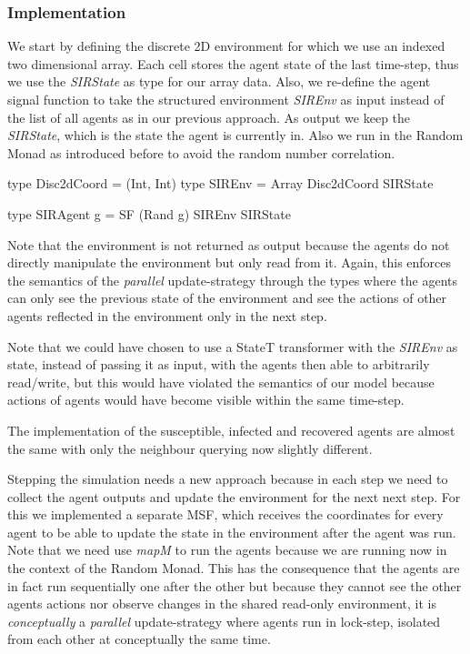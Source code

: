 \subsubsection{Implementation}
We start by defining the discrete 2D environment for which we use an indexed two dimensional array. Each cell stores the agent state of the last time-step, thus we use the \textit{SIRState} as type for our array data. Also, we re-define the agent signal function to take the structured environment \textit{SIREnv} as input instead of the list of all agents as in our previous approach. As output we keep the \textit{SIRState}, which is the state the agent is currently in. Also we run in the Random Monad as introduced before to avoid the random number correlation. 

\begin{HaskellCode}
type Disc2dCoord = (Int, Int)
type SIREnv      = Array Disc2dCoord SIRState

type SIRAgent g  = SF (Rand g) SIREnv SIRState
\end{HaskellCode}

Note that the environment is not returned as output because the agents do not directly manipulate the environment but only read from it. Again, this enforces the semantics of the \textit{parallel} update-strategy through the types where the agents can only see the previous state of the environment and see the actions of other agents reflected in the environment only in the next step.

Note that we could have chosen to use a StateT transformer with the \textit{SIREnv} as state, instead of passing it as input, with the agents then able to arbitrarily read/write, but this would have violated the semantics of our model because actions of agents would have become visible within the same time-step.

The implementation of the susceptible, infected and recovered agents are almost the same with only the neighbour querying now slightly different. 

Stepping the simulation needs a new approach because in each step we need to collect the agent outputs and update the environment for the next next step. For this we implemented a separate MSF, which receives the coordinates for every agent to be able to update the state in the environment after the agent was run. Note that we need use \textit{mapM} to run the agents because we are running now in the context of the Random Monad. This has the consequence that the agents are in fact run sequentially one after the other but because they cannot see the other agents actions nor observe changes in the shared read-only environment, it is \textit{conceptually} a \textit{parallel} update-strategy where agents run in lock-step, isolated from each other at conceptually the same time.
  
